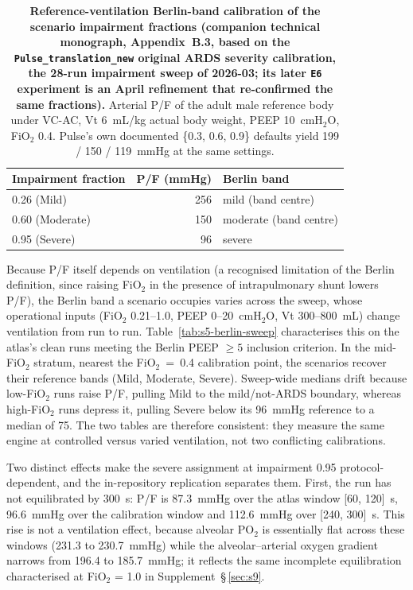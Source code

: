 \documentclass[pdflatex,sn-nature]{sn-jnl}%
\begin{document}
\begin{table}[htbp]
\centering
\caption{\textbf{Reference-ventilation Berlin-band calibration of the scenario impairment fractions (companion technical monograph, Appendix~B.3, based on the \texttt{Pulse\_translation\_new} original ARDS severity calibration, the 28-run impairment sweep of 2026-03; its later \texttt{E6} experiment is an April refinement that re-confirmed the same fractions).} Arterial P/F of the adult male reference body under VC-AC, Vt 6~mL/kg actual body weight, PEEP 10~cmH$_2$O, FiO$_2$ 0.4. Pulse's own documented \{0.3, 0.6, 0.9\} defaults yield 199 / 150 / 119~mmHg at the same settings.}
\label{tab:s5-berlin-calib}
\begin{tabular}{lrl}
\toprule
Impairment fraction & P/F (mmHg) & Berlin band \\
\midrule
0.26 (Mild)     & 256 & mild (band centre) \\
0.60 (Moderate) & 150 & moderate (band centre) \\
0.95 (Severe)   & 96  & severe \\
\bottomrule
\end{tabular}
\end{table}

Because P/F itself depends on ventilation (a recognised limitation of the Berlin definition, since raising FiO$_2$ in the presence of intrapulmonary shunt lowers P/F), the Berlin band a scenario occupies varies across the sweep, whose operational inputs (FiO$_2$ 0.21--1.0, PEEP 0--20~cmH$_2$O, Vt 300--800~mL) change ventilation from run to run. Table~\ref{tab:s5-berlin-sweep} characterises this on the atlas's clean runs meeting the Berlin PEEP $\geq 5$ inclusion criterion. In the mid-FiO$_2$ stratum, nearest the FiO$_2$~=~0.4 calibration point, the scenarios recover their reference bands (Mild, Moderate, Severe). Sweep-wide medians drift because low-FiO$_2$ runs raise P/F, pulling Mild to the mild/not-ARDS boundary, whereas high-FiO$_2$ runs depress it, pulling Severe below its 96~mmHg reference to a median of 75. The two tables are therefore consistent: they measure the same engine at controlled versus varied ventilation, not two conflicting calibrations.

Two distinct effects make the severe assignment at impairment 0.95 protocol-dependent, and the in-repository replication separates them. First, the run has not equilibrated by 300~s: P/F is 87.3~mmHg over the atlas window [60, 120]~s, 96.6~mmHg over the calibration window and 112.6~mmHg over [240, 300]~s. This rise is not a ventilation effect, because alveolar PO$_2$ is essentially flat across these windows (231.3 to 230.7~mmHg) while the alveolar--arterial oxygen gradient narrows from 196.4 to 185.7~mmHg; it reflects the same incomplete equilibration characterised at FiO$_2$ = 1.0 in Supplement~\S\,\ref{sec:s9}.
\end{document}
